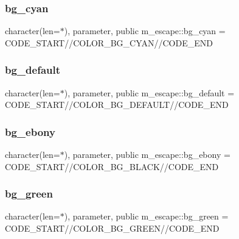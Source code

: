 \subsubsection{\texorpdfstring{bg\+\_\+cyan}{bg\_cyan}}
{\footnotesize\ttfamily character(len=$\ast$), parameter, public m\+\_\+escape\+::bg\+\_\+cyan = C\+O\+D\+E\+\_\+\+S\+T\+A\+RT//C\+O\+L\+O\+R\+\_\+\+B\+G\+\_\+\+C\+Y\+AN//C\+O\+D\+E\+\_\+\+E\+ND}

\mbox{\label{namespacem__escape_a329b88dbfe4ad42f896cdf408dcd9784}} 
\subsubsection{\texorpdfstring{bg\+\_\+default}{bg\_default}}
{\footnotesize\ttfamily character(len=$\ast$), parameter, public m\+\_\+escape\+::bg\+\_\+default = C\+O\+D\+E\+\_\+\+S\+T\+A\+RT//C\+O\+L\+O\+R\+\_\+\+B\+G\+\_\+\+D\+E\+F\+A\+U\+LT//C\+O\+D\+E\+\_\+\+E\+ND}

\mbox{\label{namespacem__escape_ab3691cc02cfaf12d6f7e18fac8a70b0b}} 
\subsubsection{\texorpdfstring{bg\+\_\+ebony}{bg\_ebony}}
{\footnotesize\ttfamily character(len=$\ast$), parameter, public m\+\_\+escape\+::bg\+\_\+ebony = C\+O\+D\+E\+\_\+\+S\+T\+A\+RT//C\+O\+L\+O\+R\+\_\+\+B\+G\+\_\+\+B\+L\+A\+CK//C\+O\+D\+E\+\_\+\+E\+ND}

\mbox{\label{namespacem__escape_a5754e4af92f738d3fd7c95daeaa7f2e1}} 
\subsubsection{\texorpdfstring{bg\+\_\+green}{bg\_green}}
{\footnotesize\ttfamily character(len=$\ast$), parameter, public m\+\_\+escape\+::bg\+\_\+green = C\+O\+D\+E\+\_\+\+S\+T\+A\+RT//C\+O\+L\+O\+R\+\_\+\+B\+G\+\_\+\+G\+R\+E\+EN//C\+O\+D\+E\+\_\+\+E\+ND}

